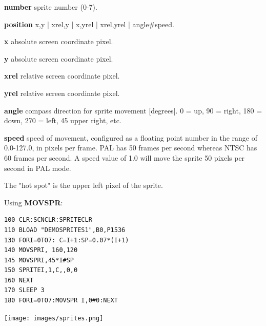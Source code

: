\begin{description}[leftmargin=2cm,style=nextline]
                {\bf number} sprite number (0-7).

                {\bf position} x,y | xrel,y | x,yrel | xrel,yrel | angle\#speed.

                {\bf x} absolute screen coordinate pixel.

                {\bf y} absolute screen coordinate pixel.

                {\bf xrel} relative screen coordinate pixel.

                {\bf yrel} relative screen coordinate pixel.

                {\bf angle} compass direction for sprite movement [degrees].
                0 = up, 90 = right, 180 = down, 270 = left, 45 upper right, etc.

                {\bf speed} speed of movement, configured as a floating point number in the
                range of 0.0-127.0, in pixels per frame.
                PAL has 50 frames per second whereas NTSC has 60 frames per second.
                A speed value of 1.0 will move the sprite 50 pixels per second
                in PAL mode.


\item [Remarks:] The "hot spot" is the upper left pixel of the sprite.

\item [Example:] Using {\bf MOVSPR}:
\begin{tcolorbox}[colback=black,coltext=white]
\verbatimfont{\codefont}
\begin{verbatim}
100 CLR:SCNCLR:SPRITECLR
110 BLOAD "DEMOSPRITES1",B0,P1536
130 FORI=0TO7: C=I+1:SP=0.07*(I+1)
140 MOVSPRI, 160,120
145 MOVSPRI,45*I#SP
150 SPRITEI,1,C,,0,0
160 NEXT
170 SLEEP 3
180 FORI=0TO7:MOVSPR I,0#0:NEXT
\end{verbatim}
\end{tcolorbox}
\item \begin{center}\texttt{[image: images/sprites.png]}\end{center}
\end{description}



\newpage
